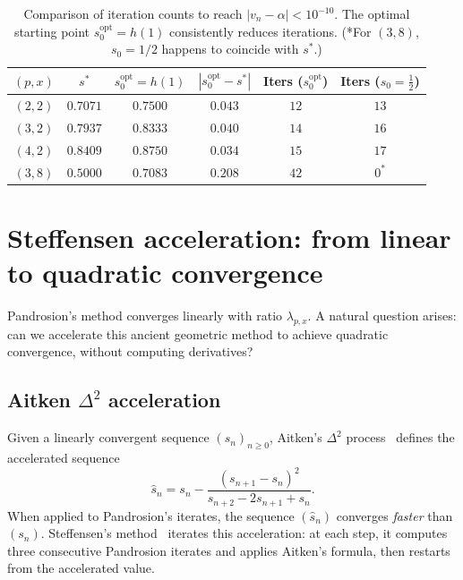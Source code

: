 \documentclass[11pt,a4paper]{article}
\theoremstyle{definition}
\begin{document}
\begin{table}[h]
\centering
\begin{tabular}{cccccc}
\toprule
$(p,x)$ & $s^*$ & $s_0^{\mathrm{opt}} = h(1)$ & $|s_0^{\mathrm{opt}} - s^*|$ & Iters ($s_0^{\mathrm{opt}}$) & Iters ($s_0 = \tfrac{1}{2}$) \\
\midrule
$(2,2)$ & $0.7071$ & $0.7500$ & $0.043$ & $12$ & $13$ \\
$(3,2)$ & $0.7937$ & $0.8333$ & $0.040$ & $14$ & $16$ \\
$(4,2)$ & $0.8409$ & $0.8750$ & $0.034$ & $15$ & $17$ \\
$(3,8)$ & $0.5000$ & $0.7083$ & $0.208$ & $42$ & $0^*$ \\
\bottomrule
\end{tabular}
\caption{Comparison of iteration counts to reach $|v_n - \alpha| < 10^{-10}$. The optimal starting point $s_0^{\mathrm{opt}} = h(1)$ consistently reduces iterations. (*For $(3,8)$, $s_0 = 1/2$ happens to coincide with $s^*$.)}
\end{table}

\section{Steffensen acceleration: from linear to quadratic convergence}
\label{sec:steffensen}

Pandrosion's method converges linearly with ratio $\lambda_{p,x}$. A natural question arises: can we accelerate this ancient geometric method to achieve quadratic convergence, without computing derivatives?

\subsection{Aitken \texorpdfstring{$\Delta^2$}{Delta-squared} acceleration}

Given a linearly convergent sequence $(s_n)_{n \geq 0}$, Aitken's $\Delta^2$ process~\cite{stoer} defines the accelerated sequence
\[
  \hat{s}_n = s_n - \frac{(s_{n+1} - s_n)^2}{s_{n+2} - 2s_{n+1} + s_n}.
\]
When applied to Pandrosion's iterates, the sequence $(\hat{s}_n)$ converges \emph{faster} than $(s_n)$. Steffensen's method~\cite{steffensen} iterates this acceleration: at each step, it computes three consecutive Pandrosion iterates and applies Aitken's formula, then restarts from the accelerated value.
\end{document}
